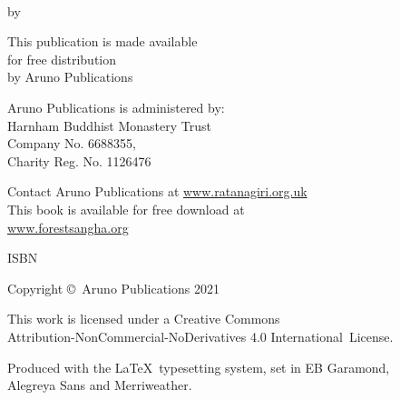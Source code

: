 \cleartoverso
\thispagestyle{empty}

{\copyrightsize
\centering
\setlength{\parindent}{0pt}%
\setlength{\parskip}{0.8\baselineskip}%

\thetitle\\
by \theauthor

This publication is made available\\
for free distribution\\
by Aruno Publications

Aruno Publications is administered by:\\
Harnham Buddhist Monastery Trust\\
Company No. 6688355,\\
Charity Reg. No. 1126476

Contact Aruno Publications at \href{https://ratanagiri.org.uk/}{www.ratanagiri.org.uk}\\
This book is available for free download at\\
\href{https://forestsangha.org/}{www.forestsangha.org}

ISBN \theISBN

Copyright \copyright\ Aruno Publications 2021

\vfill

{\footnotesize

This work is licensed under a Creative Commons\\
Attribution-NonCommercial-NoDerivatives 4.0 International~License.

Produced with the \LaTeX\ typesetting system, set in EB Garamond,\\
Alegreya Sans and Merriweather.

\ifdesktopversion
\theDigitalEditionInfo
\else
\theEditionInfo
\fi

}}
